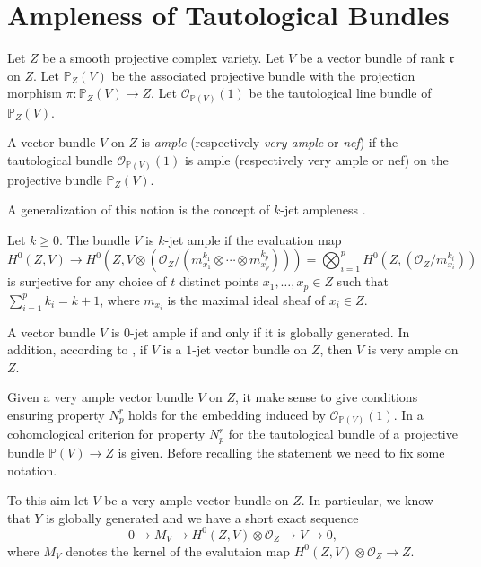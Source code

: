 \documentclass[11pt,letter]{amsart}
\numberwithin{equation}{section}
\begin{document}
\section{Ampleness of Tautological Bundles}\label{sec3}





Let $Z$ be a smooth projective complex variety. Let $V$ be a vector bundle of rank $\mathfrak{r}$ on $Z$. Let $\mathbb{P}_Z(V)$ be the associated projective bundle with the projection morphism $\pi:\mathbb{P}_Z(V)\rightarrow Z$. Let $\mathcal{O}_{\mathbb{P}(V)}(1)$ be the tautological line bundle of $\mathbb{P}_Z(V)$.
\begin{defi} 
A vector bundle $V$ on $Z$ is \emph{ample} (respectively \emph{very ample} or \emph{nef}) if the tautological bundle $\mathcal{O}_{\mathbb{P}(V)}(1)$ is ample (respectively very ample or nef) on the projective bundle $\mathbb{P}_Z(V)$. 
\end{defi}
A generalization of this notion is the concept of $k$-jet ampleness \cite[\S 1.2]{BDS}.

\begin{defi}
Let $k\geq 0$. The bundle $V$ is $k$-jet ample if the evaluation map 
\[
H^0(Z,V)\rightarrow H^0(Z,V\otimes (\mathcal{O}_Z/(m_{x_1}^{k_1}\otimes \cdots\otimes m_{x_p}^{k_p})))=\bigotimes_{i=1}^pH^0(Z,(\mathcal{O}_Z/m_{x_i}^{k_i}))
\]
is surjective for any choice of $t$ distinct points $x_1,\ldots,x_p\in Z$ such that $\sum_{i=1}^pk_i=k+1$, where $m_{x_i}$ is the maximal ideal sheaf of $x_i\in Z$.
\end{defi}

A vector bundle $V$ is $0$-jet ample if and only if it is globally generated. In addition, according to \cite[Proposition 4.2]{BDS}, if $V$ is a $1$-jet vector bundle on $Z$, then $V$ is very ample on $Z$.


Given a very ample vector bundle $V$ on $Z$, it make sense to give conditions ensuring property $N_p^r$ holds for the embedding induced by $\mathcal{O}_{\mathbb{P}(V)}(1)$. In \cite{Park} a cohomological criterion for property $N_p^r$ for the tautological bundle of a projective bundle $\mathbb{P}(V)\rightarrow Z$ is given. Before recalling the statement we need to fix some notation.\par
To this aim let $V$ be a very ample vector bundle on $Z$. In particular, we know that $Y$ is globally generated and we have a short exact sequence
\[ 0\rightarrow M_{V}\longrightarrow H^0(Z, V)\otimes\mathcal{O}_Z\longrightarrow V\rightarrow 0,\]
where $M_V$ denotes the kernel of the evalutaion map $H^0(Z,V)\otimes\mathcal{O}_Z\rightarrow Z$.
\end{document}
